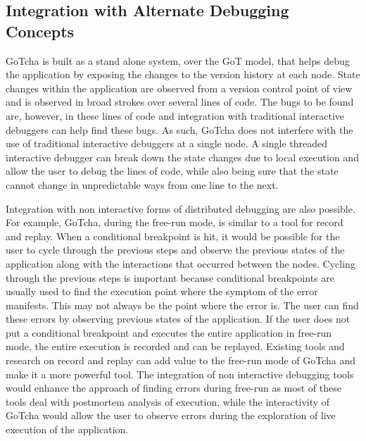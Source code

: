 \subsection{Integration with Alternate Debugging Concepts}
GoTcha is built as a stand alone system, over the GoT model, that helps debug the application by exposing the changes to the version history at each node. State changes within the application are observed from a version control point of view and is observed in broad strokes over several lines of code. The bugs to be found are, however, in these lines of code and integration with traditional interactive debuggers can help find these bugs. As such, GoTcha does not interfere with the use of traditional interactive debuggers at a single node. A single threaded interactive debugger can break down the state changes due to local execution and allow the user to debug the lines of code, while also being sure that the state cannot change in unpredictable ways from one line to the next.

Integration with non interactive forms of distributed debugging are also possible. For example, GoTcha, during the free-run mode, is similar to a tool for record and replay. When a conditional breakpoint is hit, it would be possible for the user to cycle through the previous steps and observe the previous states of the application along with the interactions that occurred between the nodes. Cycling through the previous steps is important because conditional breakpoints are usually used to find the execution point where the symptom of the error manifests. This may not always be the point where the error is. The user can find these errors by observing previous states of the application. If the user does not put a conditional breakpoint and executes the entire application in free-run mode, the entire execution is recorded and can be replayed. Existing tools and research on record and replay can add value to the free-run mode of GoTcha and make it a more powerful tool. The integration of non interactive debugging tools would enhance the approach of finding errors during free-run as most of these tools deal with postmortem analysis of execution, while the interactivity of GoTcha would allow the user to observe errors during the exploration of live execution of the application.


